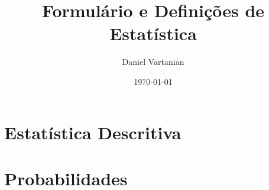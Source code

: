 \documentclass[12pt]{article}
\title{Formulário e Definições de Estatística}
\author{Daniel Vartanian}
\date{\today}
\begin{document}

	

	

	\setcounter{page}{1}

	\part{Estatística Descritiva}

	

	
	
	
	
	

	\clearpage

	\part{Probabilidades}

	

	
	
	
	
	
	
	

	\clearpage
\end{document}
